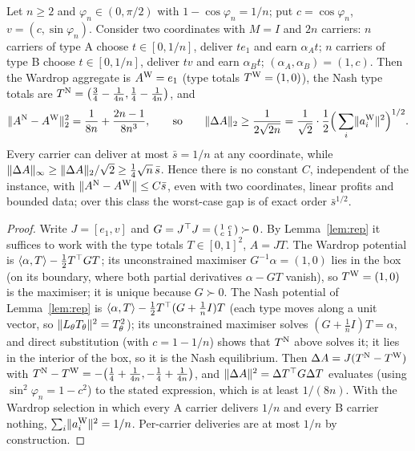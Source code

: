 \begin{proposition}[Tightness]\label{prop:tight}
Let $n\ge2$ and $\varphi_n\in(0,\pi/2)$ with $1-\cos\varphi_n=1/n$; put $c=\cos\varphi_n$, $v=(c,\sin\varphi_n)$. Consider two coordinates with $M=I$ and $2n$ carriers: $n$ carriers of type A choose $t\in[0,1/n]$, deliver $te_1$ and earn $\alpha_At$; $n$ carriers of type B choose $t\in[0,1/n]$, deliver $tv$ and earn $\alpha_Bt$; $(\alpha_A,\alpha_B)=(1,c)$. Then the Wardrop aggregate is $A^{\mathrm{W}}=e_1$ (type totals $T^{\mathrm{W}}=(1,0)$), the Nash type totals are $T^{\mathrm{N}}=\big(\tfrac34-\tfrac1{4n},\tfrac14-\tfrac1{4n}\big)$, and
\[
\lVert A^{\mathrm{N}}-A^{\mathrm{W}}\rVert_2^2=\frac1{8n}+\frac{2n-1}{8n^3},\qquad\text{so}\qquad
\lVert \Delta A\rVert_2\ge\frac{1}{2\sqrt{2n}}=\frac1{\sqrt2}\cdot\frac12\Big(\sum_i\lVert a_i^{\mathrm{W}}\rVert^2\Big)^{1/2}.
\]
Every carrier can deliver at most $\bar s=1/n$ at any coordinate, while $\lVert \Delta A\rVert_\infty\ge\lVert \Delta A\rVert_2/\sqrt2\ge\tfrac14\sqrt n\,\bar s$. Hence there is no constant $C$, independent of the instance, with $\lVert A^{\mathrm{N}}-A^{\mathrm{W}}\rVert\le C\bar s$, even with two coordinates, linear profits and bounded data; over this class the worst-case gap is of exact order $\bar s^{1/2}$.
\end{proposition}
\begin{proof}
Write $J=[e_1,v]$ and $G=J^\top J=\begin{psmallmatrix}1&c\\c&1\end{psmallmatrix}\succ0$. By Lemma~\ref{lem:rep} it suffices to work with the type totals $T\in[0,1]^2$, $A=JT$. The Wardrop potential is $\langle \alpha,T\rangle-\tfrac12T^\top GT$; its unconstrained maximiser $G^{-1}\alpha=(1,0)$ lies in the box (on its boundary, where both partial derivatives $\alpha-GT$ vanish), so $T^{\mathrm{W}}=(1,0)$ is the maximiser; it is unique because $G\succ0$. The Nash potential of Lemma~\ref{lem:rep} is $\langle \alpha,T\rangle-\tfrac12T^\top(G+\tfrac1nI)T$ (each type moves along a unit vector, so $\lVert L_\theta T_\theta\rVert^2=T_\theta^2$); its unconstrained maximiser solves $(G+\tfrac1nI)T=\alpha$, and direct substitution (with $c=1-1/n$) shows that $T^{\mathrm{N}}$ above solves it; it lies in the interior of the box, so it is the Nash equilibrium. Then $\Delta A=J(T^{\mathrm{N}}-T^{\mathrm{W}})$ with $T^{\mathrm{N}}-T^{\mathrm{W}}=-\big(\tfrac14+\tfrac1{4n},-\tfrac14+\tfrac1{4n}\big)$, and $\lVert \Delta A\rVert^2=\Delta T^\top G\Delta T$ evaluates (using $\sin^2\varphi_n=1-c^2$) to the stated expression, which is at least $1/(8n)$. With the Wardrop selection in which every A carrier delivers $1/n$ and every B carrier nothing, $\sum_i\lVert a_i^{\mathrm{W}}\rVert^2=1/n$. Per-carrier deliveries are at most $1/n$ by construction.
\end{proof}

